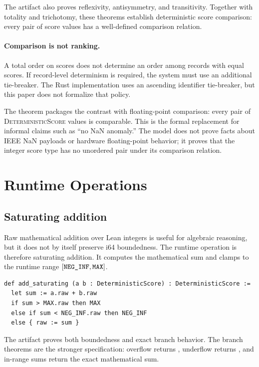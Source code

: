 \documentclass[a4paper,UKenglish,cleveref,autoref,thm-restate,anonymous]{lipics-v2021}
\newcommand{\leanname}[1]{\texttt{\detokenize{#1}}}
\newcommand{\ds}{\textsc{DeterministicScore}\xspace}
\begin{document}
The artifact also proves reflexivity, antisymmetry, and transitivity.  Together with totality and trichotomy, these theorems establish deterministic score comparison: every pair of score values has a well-defined comparison relation.

\paragraph*{Comparison is not ranking.}
A total order on scores does not determine an order among records with equal scores.  If record-level determinism is required, the system must use an additional tie-breaker.  The Rust implementation uses an ascending identifier tie-breaker, but this paper does not formalize that policy.

The theorem \leanname{no_unordered_pair} packages the contrast with floating-point comparison: every pair of \ds values is comparable.  This is the formal replacement for informal claims such as ``no NaN anomaly.''  The model does not prove facts about IEEE NaN payloads or hardware floating-point behavior; it proves that the integer score type has no unordered pair under its comparison relation.

\section{Runtime Operations}
\label{sec:runtime}

\subsection{Saturating addition}

Raw mathematical addition over Lean integers is useful for algebraic reasoning, but it does not by itself preserve i64 boundedness.  The runtime operation is therefore saturating addition.  It computes the mathematical sum and clamps to the runtime range $[\leanname{NEG_INF},\leanname{MAX}]$.

\begin{lstlisting}[language=Lean,caption={Saturating addition over the runtime range.},label={lst:sat-add}]
def add_saturating (a b : DeterministicScore) : DeterministicScore :=
  let sum := a.raw + b.raw
  if sum > MAX.raw then MAX
  else if sum < NEG_INF.raw then NEG_INF
  else { raw := sum }
\end{lstlisting}

The artifact proves both boundedness and exact branch behavior.  The branch theorems are the stronger specification: overflow returns \leanname{MAX}, underflow returns \leanname{NEG_INF}, and in-range sums return the exact mathematical sum.
\end{document}
